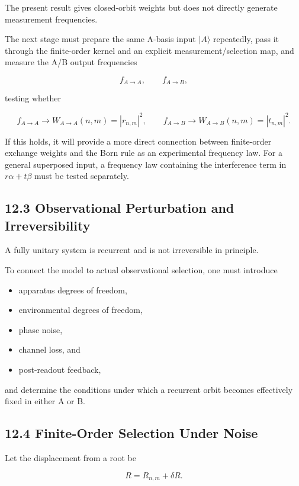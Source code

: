\documentclass[
  a4paper,
  10pt]{article}
\providecommand{\tightlist}{%
  \setlength{\itemsep}{0pt}\setlength{\parskip}{0pt}}
\begin{document}
The present result gives closed-orbit weights but does not directly
generate measurement frequencies.

The next stage must prepare the same A-basis input \(|A\rangle\)
repeatedly, pass it through the finite-order kernel and an explicit
measurement/selection map, and measure the A/B output frequencies

\[
f_{A\to A},
\qquad
f_{A\to B},
\]

testing whether

\[
f_{A\to A}\rightarrow W_{A\to A}(n,m)=|r_{n,m}|^2,
\qquad
f_{A\to B}\rightarrow W_{A\to B}(n,m)=|t_{n,m}|^2.
\]

If this holds, it will provide a more direct connection between
finite-order exchange weights and the Born rule as an experimental
frequency law. For a general superposed input, a frequency law
containing the interference term in \(r\alpha+t\beta\) must be tested
separately.

\subsection{12.3 Observational Perturbation and
Irreversibility}\label{123-observational-perturbation-and-irreversibility}

A fully unitary system is recurrent and is not irreversible in
principle.

To connect the model to actual observational selection, one must
introduce

\begin{itemize}
\tightlist
\item
  apparatus degrees of freedom,
\item
  environmental degrees of freedom,
\item
  phase noise,
\item
  channel loss, and
\item
  post-readout feedback,
\end{itemize}

and determine the conditions under which a recurrent orbit becomes
effectively fixed in either A or B.

\subsection{12.4 Finite-Order Selection Under
Noise}\label{124-finite-order-selection-under-noise}

Let the displacement from a root be

\[
R=R_{n,m}+\delta R.
\]
\end{document}
